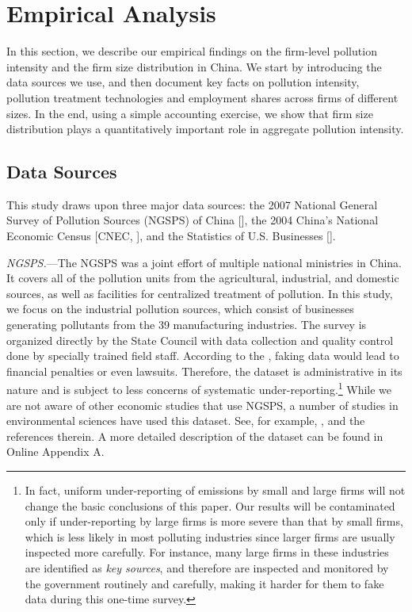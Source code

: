 \documentclass[AEJ]{AEA}
\begin{document}
\section{Empirical Analysis}

In this section, we describe our empirical findings on the firm-level pollution intensity and the firm size distribution in China. We start by introducing the data sources we use, and then document key facts on pollution intensity, pollution treatment technologies and employment shares across firms of different sizes. In the end, using a simple accounting exercise, we show that firm size distribution plays a quantitatively important role in aggregate pollution intensity.

\subsection{Data Sources}
\label{sec:data_source}

This study draws upon three major data sources: the 2007 National General Survey of Pollution Sources (NGSPS) of China [\citet{NGSPS:2007}], the 2004 China's National Economic Census [CNEC, \citet{CNEC:2004}], and the Statistics of U.S. Businesses [\citet{SUSB:2004}].

\textit{NGSPS.}---The NGSPS was a joint effort of multiple national ministries in China. It covers all of the pollution units from the agricultural, industrial, and domestic sources, as well as facilities for centralized treatment of pollution. In this study, we focus on the {industrial pollution sources}, which consist of businesses generating pollutants from the 39 manufacturing industries. The survey is organized directly by the State Council with data collection and quality control done by specially trained field staff. %
According to the \citet{Decree508}, faking data would lead to financial penalties or even lawsuits. Therefore, the dataset is administrative in its nature and is subject to less concerns of systematic under-reporting.\footnote{In fact, uniform under-reporting of emissions by small and large firms will not change the basic conclusions of this paper. Our results will be contaminated only if under-reporting by large firms is more severe than that by small firms, which is less likely in most polluting industries since larger firms are usually inspected more carefully. For instance, many large firms in these industries are identified as \textit{key sources}, and therefore are inspected and monitored by the government routinely and carefully, making it harder for them to fake data during this one-time survey.} While we are not aware of other economic studies that use NGSPS, a number of studies in environmental sciences have used this dataset. See, for example, \citet{Niuetal:2016}, \citet{Qietal:2017} and the references therein. A more detailed description of the dataset can be found in Online Appendix A.
\end{document}
